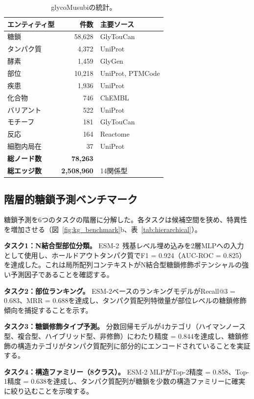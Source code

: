 \documentclass[11pt,a4paper]{ltjsarticle}
\begin{document}
\begin{table}[ht]
\centering
\caption{glycoMusubiの統計。}
\label{tab:stats}
\small
\begin{tabular}{lrl}
\toprule
\textbf{エンティティ型} & \textbf{件数} & \textbf{主要ソース} \\
\midrule
糖鎖 & 58,628 & GlyTouCan \\
タンパク質 & 4,372 & UniProt \\
酵素 & 1,459 & GlyGen \\
部位 & 10,218 & UniProt, PTMCode \\
疾患 & 1,936 & UniProt \\
化合物 & 746 & ChEMBL \\
バリアント & 522 & UniProt \\
モチーフ & 181 & GlyTouCan \\
反応 & 164 & Reactome \\
細胞内局在 & 37 & UniProt \\
\midrule
\textbf{総ノード数} & \textbf{78,263} & \\
\textbf{総エッジ数} & \textbf{2,508,960} & 14関係型 \\
\bottomrule
\end{tabular}
\end{table}

\subsection{階層的糖鎖予測ベンチマーク}

糖鎖予測を6つのタスクの階層に分解した。各タスクは候補空間を狭め、特異性を増加させる（図~\ref{fig:kg_benchmark}b、表~\ref{tab:hierarchical}）。

\textbf{タスク1：N結合型部位分類。}
ESM-2~\cite{lin2023}残基レベル埋め込みを2層MLPへの入力として使用し、ホールドアウトタンパク質でF1 = 0.924（AUC-ROC = 0.825）を達成した。これは局所配列コンテキストがN結合型糖鎖修飾ポテンシャルの強い予測因子であることを確認する。

\textbf{タスク2：部位ランキング。}
ESM-2ベースのランキングモデルがRecall@3 = 0.683、MRR = 0.688を達成し、タンパク質配列特徴量が部位レベルの糖鎖修飾傾向を捕捉することを示す。

\textbf{タスク3：糖鎖修飾タイプ予測。}
分数回帰モデルが4カテゴリ（ハイマンノース型、複合型、ハイブリッド型、非修飾）にわたり精度 = 0.844を達成し、糖鎖修飾の構造カテゴリがタンパク質配列に部分的にエンコードされていることを実証する。

\textbf{タスク4：構造ファミリー（8クラス）。}
ESM-2 MLPがTop-2精度 = 0.858、Top-1精度 = 0.638を達成し、タンパク質配列が糖鎖を少数の構造ファミリーに確実に絞り込むことを示唆する。
\end{document}
